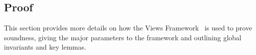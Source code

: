 \subsection{Proof}
\label{sec:proof}
This section provides more details on how the Views Framework~\cite{views} is used to prove soundness, giving the major parameters to the framework and outlining global invariants and key lemmas.


